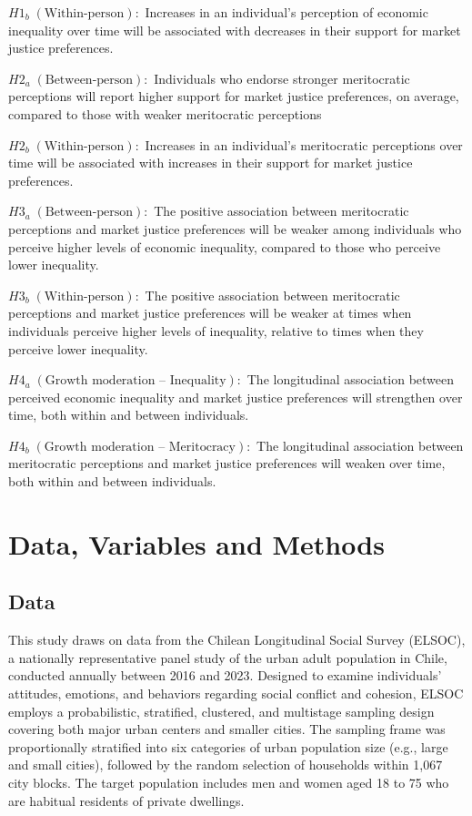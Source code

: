 \documentclass[
  12pt,
]{article}
\begin{document}
\(H1_{b} \; (\text{Within-person}):\) Increases in an individual's
perception of economic inequality over time will be associated with
decreases in their support for market justice preferences.

\(H2_{a} \; (\text{Between-person}):\) Individuals who endorse stronger
meritocratic perceptions will report higher support for market justice
preferences, on average, compared to those with weaker meritocratic
perceptions

\(H2_{b} \; (\text{Within-person}):\) Increases in an individual's
meritocratic perceptions over time will be associated with increases in
their support for market justice preferences.

\(H3_{a} \; (\text{Between-person}):\) The positive association between
meritocratic perceptions and market justice preferences will be weaker
among individuals who perceive higher levels of economic inequality,
compared to those who perceive lower inequality.

\(H3_{b} \; (\text{Within-person}):\) The positive association between
meritocratic perceptions and market justice preferences will be weaker
at times when individuals perceive higher levels of inequality, relative
to times when they perceive lower inequality.

\(H4_{a} \; (\text{Growth moderation – Inequality}):\) The longitudinal
association between perceived economic inequality and market justice
preferences will strengthen over time, both within and between
individuals.

\(H4_{b} \; (\text{Growth moderation – Meritocracy}):\) The longitudinal
association between meritocratic perceptions and market justice
preferences will weaken over time, both within and between individuals.

\section{Data, Variables and Methods}\label{data-variables-and-methods}

\subsection{Data}\label{data}

This study draws on data from the Chilean Longitudinal Social Survey
(ELSOC), a nationally representative panel study of the urban adult
population in Chile, conducted annually between 2016 and 2023. Designed
to examine individuals' attitudes, emotions, and behaviors regarding
social conflict and cohesion, ELSOC employs a probabilistic, stratified,
clustered, and multistage sampling design covering both major urban
centers and smaller cities. The sampling frame was proportionally
stratified into six categories of urban population size (e.g., large and
small cities), followed by the random selection of households within
1,067 city blocks. The target population includes men and women aged 18
to 75 who are habitual residents of private dwellings.
\end{document}
